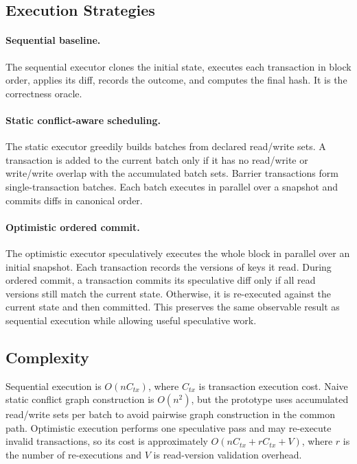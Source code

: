 \documentclass[runningheads]{llncs}
\begin{document}
\subsection{Execution Strategies}

\paragraph{Sequential baseline.}
The sequential executor clones the initial state, executes each transaction in block order, applies its diff, records the outcome, and computes the final hash. It is the correctness oracle.

\paragraph{Static conflict-aware scheduling.}
The static executor greedily builds batches from declared read/write sets. A transaction is added to the current batch only if it has no read/write or write/write overlap with the accumulated batch sets. Barrier transactions form single-transaction batches. Each batch executes in parallel over a snapshot and commits diffs in canonical order.

\paragraph{Optimistic ordered commit.}
The optimistic executor speculatively executes the whole block in parallel over an initial snapshot. Each transaction records the versions of keys it read. During ordered commit, a transaction commits its speculative diff only if all read versions still match the current state. Otherwise, it is re-executed against the current state and then committed. This preserves the same observable result as sequential execution while allowing useful speculative work.

\subsection{Complexity}

Sequential execution is $O(nC_{tx})$, where $C_{tx}$ is transaction execution cost. Naive static conflict graph construction is $O(n^2)$, but the prototype uses accumulated read/write sets per batch to avoid pairwise graph construction in the common path. Optimistic execution performs one speculative pass and may re-execute invalid transactions, so its cost is approximately $O(nC_{tx} + rC_{tx} + V)$, where $r$ is the number of re-executions and $V$ is read-version validation overhead.
\end{document}
